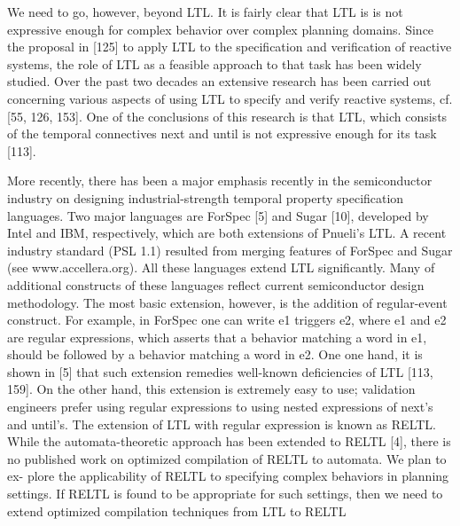 We need to go, however, beyond LTL. It is fairly clear that LTL is is not expressive enough for complex behavior over complex planning domains. Since the proposal in [125] to apply LTL to the specification and verification of reactive systems, the role of LTL as a feasible approach to that task has been widely studied. Over the past two decades an extensive research has been carried out concerning various aspects of using LTL to specify and verify reactive systems, cf. [55, 126, 153]. One of the conclusions of this research is that LTL, which consists of the temporal connectives next and until is not expressive enough for its task [113]. 

More recently, there has been a major emphasis recently in the semiconductor industry on designing industrial-strength temporal property specification languages. Two major languages are ForSpec [5] and Sugar [10], developed by Intel and IBM, respectively, which are both extensions of Pnueli’s LTL. A recent industry standard (PSL 1.1) resulted from merging features of ForSpec and Sugar (see www.accellera.org). All these languages extend LTL significantly. Many of additional constructs of these languages reflect current semiconductor design methodology. The most basic extension, however, is the addition of regular-event construct. For example, in ForSpec one can write e1 triggers e2, where e1 and e2 are regular expressions, which asserts that a behavior matching a word in e1, should be followed by a behavior matching a word in e2. One one hand, it is shown in [5] that such extension remedies well-known deficiencies of LTL [113, 159]. On the other hand, this extension is extremely easy to use; validation engineers prefer using regular expressions to using nested expressions of next’s and until’s. The extension of LTL with regular expression is known as RELTL. While the automata-theoretic approach has been extended to RELTL [4], there is no published work on optimized compilation of RELTL to automata. We plan to ex- plore the applicability of RELTL to specifying complex behaviors in planning settings. If RELTL is found to be appropriate for such settings, then we need to extend optimized compilation techniques from LTL to RELTL




